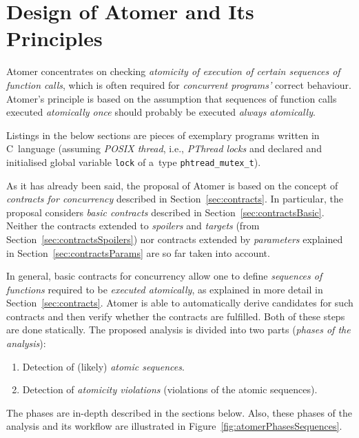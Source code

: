 \section{Design of Atomer and Its Principles}
\label{sec:atomerDesing}


Atomer concentrates on checking \emph{atomicity of execution of certain
sequences of function calls}, which is often required for \emph{concurrent
programs'} correct behaviour. Atomer's principle is based on the assumption
that sequences of function calls executed \emph{atomically once}
should probably be executed \emph{always atomically}.

Listings in the below sections are pieces of exemplary programs written
in C~language (assuming \emph{POSIX thread}, i.e., \emph{PThread locks}
and declared and initialised global variable \texttt{lock} of a~type
\texttt{phtread\_mutex\_t}).

As it has already been said, the proposal of Atomer is based on the concept
of \emph{contracts for concurrency} described in Section~\ref{sec:contracts}.
In particular, the proposal considers \emph{basic contracts} described in
Section~\ref{sec:contractsBasic}. Neither the contracts extended to
\emph{spoilers} and \emph{targets} (from Section~\ref{sec:contractsSpoilers})
nor contracts extended by \emph{parameters} explained in
Section~\ref{sec:contractsParams} are so far taken into account.

In general, basic contracts for concurrency allow one to define \emph{sequences
of functions} required to be \emph{executed atomically}, as explained in more
detail in Section~\ref{sec:contracts}. Atomer is able to automatically derive
candidates for such contracts and then verify whether the contracts are
fulfilled. Both of these steps are done statically. The proposed analysis is
divided into two parts (\emph{phases of the analysis}):
\begin{enumerate}[label={\textbf{Phase~\arabic*}:}, leftmargin=5em]
    \item
        Detection of (likely) \emph{atomic sequences}.

    \item
        Detection of \emph{atomicity violations} (violations of the atomic
        sequences).
\end{enumerate}
The phases are in-depth described in the sections below. Also, these phases of
the analysis and its workflow are illustrated in
Figure~\ref{fig:atomerPhasesSequences}.

